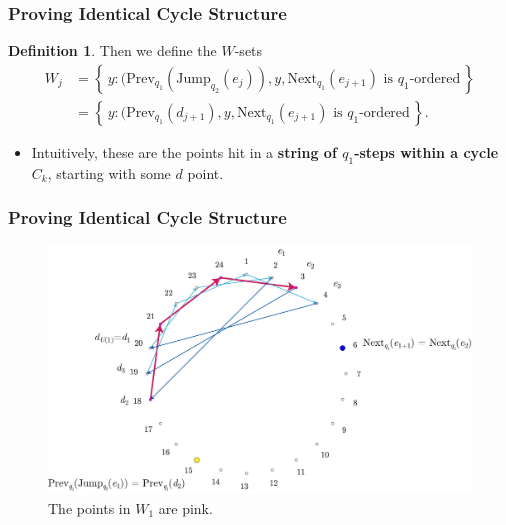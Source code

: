 \documentclass{beamer}
\theoremstyle{plain}
\theoremstyle{definition}
\newtheorem{Def}[theorem]{Definition}
\theoremstyle{remark}
\newcommand{\bee}{\begin{equation}\begin{aligned}}
\newcommand{\eee}{\end{aligned}\end{equation}}
\renewcommand{\'}{\hspace{0.5mm}'}		%
\renewcommand{\Set}[1]{\left\{\,#1\,\right\}}	%
\begin{document}

\begin{frame}
\frametitle{Proving Identical Cycle Structure}

	\begin{Def}
		Then we define the $W$-sets
		\bee
			W_j &= \Set{y:(\mathrm{Prev}_{q_1}
			(\mathrm{Jump}_{q_2}(e_j)), y, 
			\mathrm{Next}_{q_1}(e_{j + 1}) 
			\text{ is }q_1\text{-ordered}} \\
			&=
				\Set{y:(\mathrm{Prev}_{q_1}
			(d_{j + 1}), y, 
			\mathrm{Next}_{q_1}(e_{j + 1}) 
			\text{ is }q_1\text{-ordered}}. 
		\eee
	\end{Def}
	\begin{itemize}
		\item Intuitively, these are the points 
		hit in a \textbf{string of $q_1$-steps within
		a cycle} $C_k$, starting with some $d$ point. 
	\end{itemize}

\end{frame}


\begin{frame}
\frametitle{Proving Identical Cycle Structure}

	\begin{figure}
		\includegraphics[scale=0.15]{circ_24_W.jpg}
		\caption{The points in $W_1$ are pink. }
	\end{figure}


\end{frame}

\end{document}
